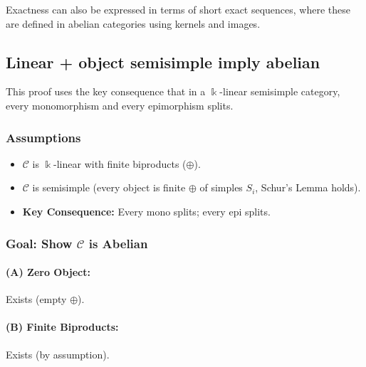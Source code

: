 \documentclass[11pt]{article}
\theoremstyle{definition}
\begin{document}
Exactness can also be expressed in terms of short exact sequences, where these are defined in abelian categories using kernels and images.



\subsection{Linear + object semisimple imply abelian}\label{lnear_and_ss_imply_abelian}

This proof uses the key consequence that in a \(\Bbbk\)-linear semisimple category, every monomorphism and every epimorphism splits.

\subsubsection*{Assumptions}
\begin{itemize}
  \item \(\mathcal{C}\) is \(\Bbbk\)-linear with finite biproducts (\(\oplus\)).
  \item \(\mathcal{C}\) is semisimple (every object is finite \(\oplus\) of simples \(S_i\), Schur's Lemma holds).
  \item \textbf{Key Consequence:} Every mono splits; every epi splits.
\end{itemize}

\subsubsection*{Goal: Show \(\mathcal{C}\) is Abelian}

\paragraph{(A) Zero Object:} Exists (empty \(\oplus\)).

\paragraph{(B) Finite Biproducts:} Exists (by assumption).
\end{document}
